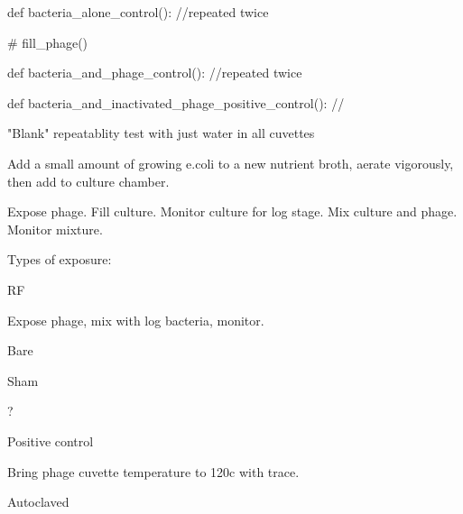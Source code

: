 \documentclass[paper.tex]{subfiles}%
\begin{document}
def bacteria_alone_control():
    //repeated twice

    # fill_phage()


def bacteria_and_phage_control():
    //repeated twice


def bacteria_and_inactivated_phage_positive_control():
    //

"Blank" repeatablity test with just water in all cuvettes


Add a small amount of growing e.coli to a new nutrient broth,
aerate vigorously, then add to culture chamber.

Expose phage.
Fill culture.
Monitor culture for log stage.
Mix culture and phage.
Monitor mixture.

Types of exposure:

RF

Expose phage, mix with log bacteria, monitor.

Bare

Sham

?

Positive control

Bring phage cuvette temperature to 120c with trace.



Autoclaved
\end{document}
